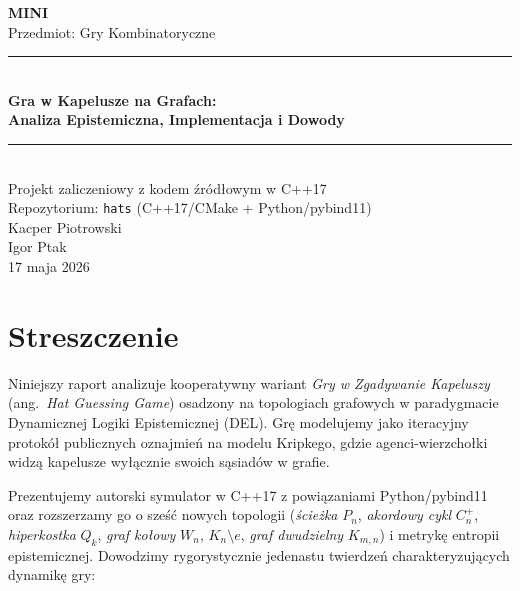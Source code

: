 \documentclass[12pt,a4paper]{article}
\theoremstyle{plain}
\theoremstyle{definition}
\theoremstyle{remark}
\begin{document}
\begin{titlepage}
  \centering
  \vspace*{1.5cm}
  {\Large\bfseries MINI}\\[0.3cm]
  {\large Przedmiot: Gry Kombinatoryczne}\\[1.5cm]
  \rule{\linewidth}{1.5pt}\\[0.4cm]
  {\LARGE\bfseries Gra w Kapelusze na Grafach:\\[0.2cm]
  Analiza Epistemiczna, Implementacja i Dowody}\\[0.4cm]
  \rule{\linewidth}{1.5pt}\\[1.2cm]
  {\large Projekt zaliczeniowy z kodem źródłowym w C++17}\\[0.2cm]
  {\large Repozytorium: \texttt{hats} (C++17/CMake + Python/pybind11)}\\[1.5cm]
  {\large Kacper Piotrowski}\\[0.3cm]
  {\large Igor Ptak}\\[0.3cm]
  {\large 17 maja 2026}
  \vfill
\end{titlepage}

\tableofcontents
\newpage

\section{Streszczenie}

Niniejszy raport analizuje kooperatywny wariant \emph{Gry w Zgadywanie Kapeluszy} (ang.\ \textit{Hat Guessing Game}) osadzony na topologiach grafowych w paradygmacie Dynamicznej Logiki Epistemicznej (DEL). Grę modelujemy jako iteracyjny protokół publicznych oznajmień na modelu Kripkego, gdzie agenci-wierzchołki widzą kapelusze wyłącznie swoich sąsiadów w grafie.

Prezentujemy autorski symulator w C++17 z powiązaniami Python/pybind11 oraz rozszerzamy go o sześć nowych topologii (\textit{ścieżka} $P_n$, \textit{akordowy cykl} $C_n^+$, \textit{hiperkostka} $Q_k$, \textit{graf kołowy} $W_n$, $K_n \setminus e$, \textit{graf dwudzielny} $K_{m,n}$) i metrykę entropii epistemicznej. Dowodzimy rygorystycznie jedenastu twierdzeń charakteryzujących dynamikę gry:
\end{document}
